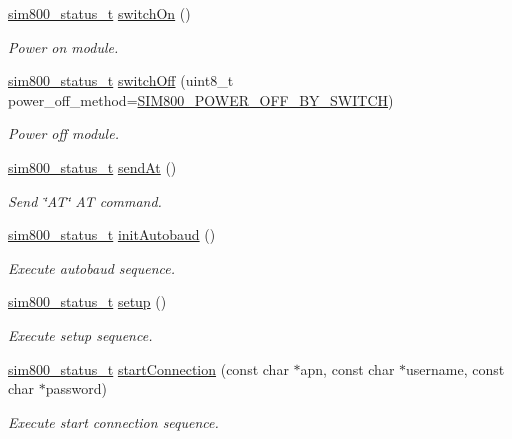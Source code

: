 \begin{DoxyCompactItemize}
\hyperlink{sim800_8h_a3d1eeaa095df003ea28385b81a134b27}{sim800\+\_\+status\+\_\+t} \hyperlink{classSIM800_a30eb06e923b419efac4866dd630ae849}{switch\+On} ()
\begin{DoxyCompactList}\small\item\em Power on module. \end{DoxyCompactList}\item 
\hyperlink{sim800_8h_a3d1eeaa095df003ea28385b81a134b27}{sim800\+\_\+status\+\_\+t} \hyperlink{classSIM800_a6a7ee5f0c1ebaef0e04d3d0a8cb05032}{switch\+Off} (uint8\+\_\+t power\+\_\+off\+\_\+method=\hyperlink{sim800_8h_afec179273e643a34ac7e4991be4dfe7d}{S\+I\+M800\+\_\+\+P\+O\+W\+E\+R\+\_\+\+O\+F\+F\+\_\+\+B\+Y\+\_\+\+S\+W\+I\+T\+CH})
\begin{DoxyCompactList}\small\item\em Power off module. \end{DoxyCompactList}\item 
\hyperlink{sim800_8h_a3d1eeaa095df003ea28385b81a134b27}{sim800\+\_\+status\+\_\+t} \hyperlink{classSIM800_a05cceb142dd2e23b6459075f19c04ae8}{send\+At} ()
\begin{DoxyCompactList}\small\item\em Send \char`\"{}\+A\+T\char`\"{} AT command. \end{DoxyCompactList}\item 
\hyperlink{sim800_8h_a3d1eeaa095df003ea28385b81a134b27}{sim800\+\_\+status\+\_\+t} \hyperlink{classSIM800_ae2c0405faa73c05dd486b2a3f8086eb4}{init\+Autobaud} ()
\begin{DoxyCompactList}\small\item\em Execute autobaud sequence. \end{DoxyCompactList}\item 
\hyperlink{sim800_8h_a3d1eeaa095df003ea28385b81a134b27}{sim800\+\_\+status\+\_\+t} \hyperlink{classSIM800_af689d4460f01f57a910d4befc82b9b81}{setup} ()
\begin{DoxyCompactList}\small\item\em Execute setup sequence. \end{DoxyCompactList}\item 
\hyperlink{sim800_8h_a3d1eeaa095df003ea28385b81a134b27}{sim800\+\_\+status\+\_\+t} \hyperlink{classSIM800_aef7d718949e714a45d2f671fbd14e804}{start\+Connection} (const char $\ast$apn, const char $\ast$username, const char $\ast$password)
\begin{DoxyCompactList}\small\item\em Execute start connection sequence. \end{DoxyCompactList}\item 

\end{DoxyCompactItemize}
